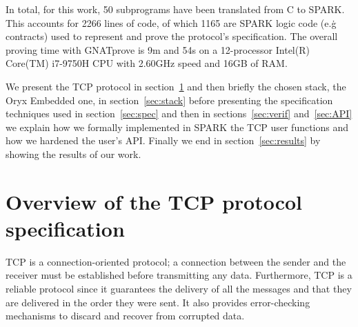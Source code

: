\documentclass[conference]{IEEEtran}
\begin{document}
In total, for this work, 50 subprograms have been translated from C to SPARK. This accounts for 2266 lines of code, of which 1165 are SPARK logic code (e.g\.~ contracts) used to represent and prove the protocol's specification. The overall proving time with GNATprove is 9m and 54s on a 12-processor Intel(R) Core(TM) i7-9750H CPU with 2.60GHz speed and 16GB of RAM.


We present the TCP protocol in section~\ref{sec:TCP} and then briefly the
chosen stack, the Oryx Embedded one, in section~\ref{sec:stack}
before presenting the specification techniques used in section~\ref{sec:spec}
and then in sections~\ref{sec:verif} and~\ref{sec:API} we explain how we
formally implemented in SPARK the TCP user functions and how we hardened the
user's API. Finally we end in section~\ref{sec:results} by showing the results
of our work.

\section{Overview of the TCP protocol specification}
\label{sec:TCP}



TCP is a connection-oriented protocol; a connection between the sender and the receiver must be established before transmitting any data. Furthermore, TCP is a reliable protocol since it guarantees the delivery of all the messages and that they are delivered in the order they were sent. It also provides error-checking mechanisms to discard and recover from corrupted data.

\end{document}
